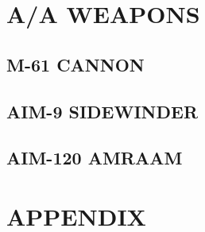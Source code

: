 \documentclass[fontInter]{TechCheck}
\begin{document}
	\cleardoublepage

	\chapter{A/A WEAPONS}
	\minitoc
	\cleardoublepage

	\section{M-61 CANNON}

	\clearpage

	\section{AIM-9 SIDEWINDER}

	\clearpage 

	\section{AIM-120 AMRAAM}

	\chapter{APPENDIX}
	\minitoc
	\cleardoublepage


  \cleardoublepage

\iftoggle{print}{
	\pagestyle{empty}
	\newpage \null
	\thumbwide
	\newpage \null
}{}
\end{document}
